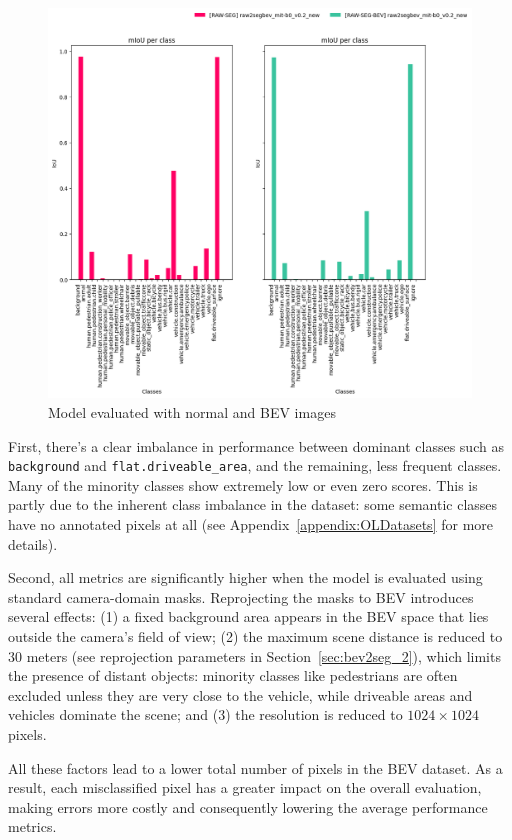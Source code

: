 \begin{figure}[h!]
    \centering
    \includegraphics[width=0.8\linewidth]{./images/experiments/raw2segbev_mit-b0_v0.2_new_test_evaluation.png}
    \caption{Model evaluated with normal and BEV images}
    \label{fig:normal_vs_bev_evaluation}
\end{figure}

First, there's a clear imbalance in performance between dominant classes such as \texttt{background} and \texttt{flat.driveable\_area}, and the remaining, less frequent classes. Many of the minority classes show extremely low or even zero  scores. This is partly due to the inherent class imbalance in the dataset: some semantic classes have no annotated pixels at all (see Appendix~\ref{appendix:OLDatasets} for more details).

Second, all metrics are significantly higher when the model is evaluated using standard camera-domain masks. Reprojecting the masks to BEV introduces several effects: (1) a fixed background area appears in the BEV space that lies outside the camera's field of view; (2) the maximum scene distance is reduced to $30$ meters (see reprojection parameters in Section~\ref{sec:bev2seg_2}), which limits the presence of distant objects: minority classes like pedestrians are often excluded unless they are very close to the vehicle, while driveable areas and vehicles dominate the scene; and (3) the resolution is reduced to $1024 \times 1024$ pixels.

All these factors lead to a lower total number of pixels in the BEV dataset. As a result, each misclassified pixel has a greater impact on the overall evaluation, making errors more costly and consequently lowering the average performance metrics.

